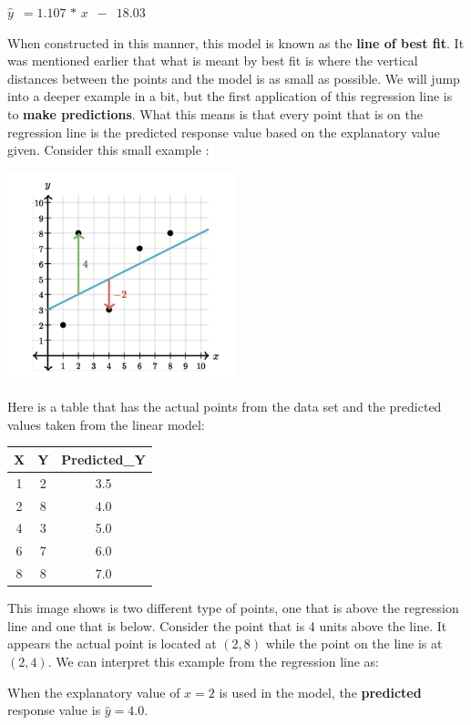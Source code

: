 \documentclass[
  letterpaper,
  DIV=11,
  numbers=noendperiod]{scrreprt}
\begin{document}
\(\displaystyle{\hat{y} \,\,\, = 1.107\,*\, x \,\,\, - \,\,\, 18.03}\)

When constructed in this manner, this model is known as the \textbf{line
of best fit}. It was mentioned earlier that what is meant by best fit is
where the vertical distances between the points and the model is as
small as possible. We will jump into a deeper example in a bit, but the
first application of this regression line is to \textbf{make
predictions}. What this means is that every point that is on the
regression line is the predicted response value based on the explanatory
value given. Consider this small example :

\includegraphics[width=0.5\textwidth,height=\textheight]{./images/ROP_1.jpg}

Here is a table that has the actual points from the data set and the
predicted values taken from the linear model:

\begin{longtable*}[t]{ccc}
\toprule
X & Y & Predicted\_Y\\
 & 2 & 3.5\\
2 & 8 & 4.0\\
4 & 3 & 5.0\\
6 & 7 & 6.0\\
8 & 8 & 7.0\\
\bottomrule
\end{longtable*}

This image shows is two different type of points, one that is above the
regression line and one that is below. Consider the point that is 4
units above the line. It appears the actual point is located at
\((2, 8)\) while the point on the line is at \((2, 4)\). We can
interpret this example from the regression line as:

When the explanatory value of \(x = 2\) is used in the model, the
\textbf{predicted} response value is \(\hat{y} = 4.0\).
\end{document}
